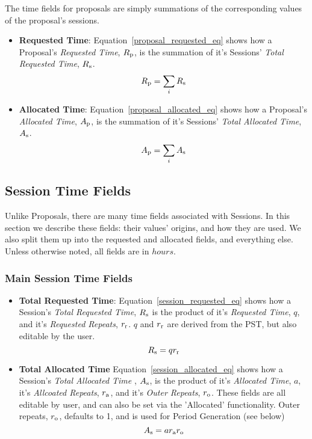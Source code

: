 \documentclass{article}
\begin{document}
The time fields for proposals are simply summations of the corresponding values of the proposal's sessions.
\begin{itemize}
\item {\bf Requested Time}:
Equation~\ref{proposal_requested_eq} shows how a Proposal's {\it Requested Time}, $R_{\rm p}$, is the summation of it's Sessions' {\it Total Requested Time}, $R_{\rm s}$.
\begin{equation}
\label{proposal_requested_eq}
R_{\rm p} = \sum_i R_{\rm s}  
\end{equation}

\item {\bf Allocated Time}:
Equation~\ref{proposal_allocated_eq} shows how a Proposal's {\it Allocated Time}, $A_{\rm p}$, is the summation of it's Sessions' {\it Total Allocated Time},  $A_{\rm s}$.
\begin{equation}
\label{proposal_allocated_eq}
A_{\rm p} = \sum_i A_{\rm s}
\end{equation}
\end{itemize}

\subsection{Session Time Fields}

Unlike Proposals, there are many time fields associated with Sessions.  In this section we describe these fields: their values' origins, and how they are used.  We also split them up into the requested and allocated fields, and everything else.  Unless otherwise noted, all fields are in $hours$.

\subsubsection{Main Session Time Fields}
\begin{itemize}
\item {\bf Total Requested Time}:
Equation~\ref{session_requested_eq} shows how a Session's {\it Total Requested Time}, $R_{\rm s}$ is the product of it's {\it Requested Time}, $q$, and it's {\it Requested Repeats}, $r_{\rm r}$. $q$ and $r_{\rm r}$ are derived from the PST, but also editable by the user.  
\begin{equation}
\label{session_requested_eq}
R_{\rm s} = q r_{\rm r}  
\end{equation}

\item {\bf Total Allocated Time}
Equation~\ref{session_allocated_eq} shows how a Session's {\it Total Allocated Time }, $A_{\rm s}$, is the product of it's {\it Allocated Time}, $a$, it's {\it Allcoated Repeats}, $r_{\rm a}$, and it's {\it Outer Repeats}, $r_{\rm o}$.  These fields are all editable by user, and can also be set via the 'Allocated' functionality.  Outer repeats, $r_{\rm o}$, defaults to 1, and is used for Period Generation (see below)
\begin{equation}
\label{session_allocated_eq}
A_{\rm s} = a r_{\rm a} r_{\rm o} 
\end{equation}


\end{itemize}
\end{document}
